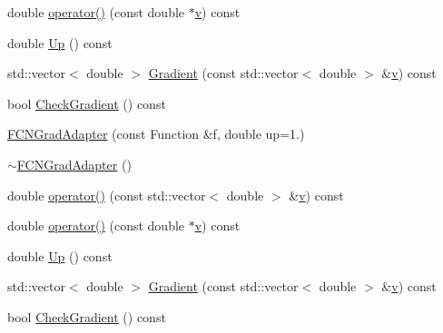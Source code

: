 \begin{DoxyCompactItemize}
double \mbox{\hyperlink{classROOT_1_1Minuit2_1_1FCNGradAdapter_a3e3916bd20059d8e4a3f4938864ac2d7}{operator()}} (const double $\ast$\mbox{\hyperlink{adat__devel_2lib_2hadron_2hadron__timeslice_8cc_a716fc87f5e814be3ceee2405ed6ff22a}{v}}) const
\item 
double \mbox{\hyperlink{classROOT_1_1Minuit2_1_1FCNGradAdapter_a99e41f07b3f7374c0b17ef42f1c15a19}{Up}} () const
\item 
std\+::vector$<$ double $>$ \mbox{\hyperlink{classROOT_1_1Minuit2_1_1FCNGradAdapter_ae91d0453fd5e953f75551576659d6c7b}{Gradient}} (const std\+::vector$<$ double $>$ \&\mbox{\hyperlink{adat__devel_2lib_2hadron_2hadron__timeslice_8cc_a716fc87f5e814be3ceee2405ed6ff22a}{v}}) const
\item 
bool \mbox{\hyperlink{classROOT_1_1Minuit2_1_1FCNGradAdapter_a10faf0c868284a440f291465b7efd08e}{Check\+Gradient}} () const
\item 
\mbox{\hyperlink{classROOT_1_1Minuit2_1_1FCNGradAdapter_a1836db737b7f09a9acc99b9206abed81}{F\+C\+N\+Grad\+Adapter}} (const Function \&f, double up=1.)
\item 
\mbox{\hyperlink{classROOT_1_1Minuit2_1_1FCNGradAdapter_a7b15e8e6baa870bc150e04cb4a5ad946}{$\sim$\+F\+C\+N\+Grad\+Adapter}} ()
\item 
double \mbox{\hyperlink{classROOT_1_1Minuit2_1_1FCNGradAdapter_a101e87d4c03ae367b24227b41bb258c4}{operator()}} (const std\+::vector$<$ double $>$ \&\mbox{\hyperlink{adat__devel_2lib_2hadron_2hadron__timeslice_8cc_a716fc87f5e814be3ceee2405ed6ff22a}{v}}) const
\item 
double \mbox{\hyperlink{classROOT_1_1Minuit2_1_1FCNGradAdapter_a3e3916bd20059d8e4a3f4938864ac2d7}{operator()}} (const double $\ast$\mbox{\hyperlink{adat__devel_2lib_2hadron_2hadron__timeslice_8cc_a716fc87f5e814be3ceee2405ed6ff22a}{v}}) const
\item 
double \mbox{\hyperlink{classROOT_1_1Minuit2_1_1FCNGradAdapter_a99e41f07b3f7374c0b17ef42f1c15a19}{Up}} () const
\item 
std\+::vector$<$ double $>$ \mbox{\hyperlink{classROOT_1_1Minuit2_1_1FCNGradAdapter_ae91d0453fd5e953f75551576659d6c7b}{Gradient}} (const std\+::vector$<$ double $>$ \&\mbox{\hyperlink{adat__devel_2lib_2hadron_2hadron__timeslice_8cc_a716fc87f5e814be3ceee2405ed6ff22a}{v}}) const
\item 
bool \mbox{\hyperlink{classROOT_1_1Minuit2_1_1FCNGradAdapter_a10faf0c868284a440f291465b7efd08e}{Check\+Gradient}} () const
\end{DoxyCompactItemize}


